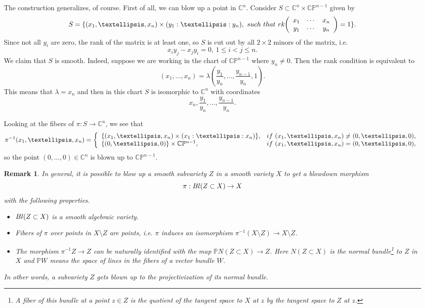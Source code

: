 \documentclass[11pt]{article}
\numberwithin{equation}{section}
\numberwithin{footnote}{section}
\newtheorem{rem}[thm]{Remark}
\renewcommand{\P}{{\mathbb P}}
\newcommand{\C}{{\mathbb C}}
\begin{document}
\smallskip
The construction generalizes, of course. First of all, we can blow up a point in $\C^n$. Consider 
$S\subset \C^n \times \C\P^{n-1}$ given by
$$
S=\{(x_1,\ldots,x_n) \times (y_1:\ldots:y_n),{\rm ~such~that~rk}\hskip -2pt
\left(
\begin{array}{ccc}
x_1& \cdots &x_n \\
y_1& \cdots &y_n 
\end{array}
\right)
=1\}.
$$
Since not all $y_i$ are zero, the rank of the matrix is at least one, so $S$ is cut out by all $2\times 2$ minors of the matrix, i.e.
$$
x_i y_j -x_j y_i =0,~ 1\leq i<j\leq n.
$$
We claim that $S$ is smooth. Indeed, suppose we are working in the chart of $\C\P^{n-1}$ where $y_n\neq 0$. Then
the rank condition is equivalent to 
$$
(x_1,\ldots,x_n) = \lambda(\frac {y_1}{y_n},\ldots,\frac {y_{n-1}}{y_n},1).
$$
This means that $\lambda =x_n$ and then in this chart $S$ is isomorphic to $\C^n$ with coordinates 
$$x_n,\frac  {y_1}{y_n},\ldots, \frac{y_{n-1}}{y_n}.$$

\smallskip
Looking at the fibers of $\pi :S \to \C^n$, we see that 
$$
\pi^{-1}(x_1,\ldots,x_n) = \left\{\begin{array}{ll}\{(x_1,\ldots,x_n)\times (x_1:\ldots:x_n)\},&{\rm if~}(x_1,\ldots,x_n)\neq (0,\ldots,0),\\
\{(0,\ldots,0)\}\times\C\P^{n-1},&{\rm if~}(x_1,\ldots,x_n)= (0,\ldots,0),\end{array}\right.
$$
so the point $(0,\ldots,0)\in\C^n$ is blown up to $\C\P^{n-1}$.

\smallskip
\begin{rem}
In general, it is possible to blow up a smooth subvariety $Z$ in a smooth variety $X$ to get a blowdown morphism
$$
\pi:{\rm Bl}(Z\subset X)\to X
$$
with the following properties.
\begin{itemize}
\item
${\rm Bl}(Z\subset X)$ is a smooth algebraic variety.

\item
Fibers of $\pi$ over points in $X\setminus Z$ are points, i.e. $\pi$ induces an isomorphism 
$\pi^{-1}(X\setminus Z)\to X\setminus Z$.

\item
The morphism $\pi^{-1}Z\to Z$ can be naturally identified with the map $\P N(Z\subset X) \to Z$.
Here $N(Z\subset X)$ is the normal bundle\footnote{ A fiber of this bundle at a point $z\in Z$ is the quotient of the tangent space to $X$ at $z$ by the tangent space to $Z$ at $z$.}
 to $Z$ in $X$ and $\P W$ means the space of lines in the fibers of 
a vector bundle $W$.
\end{itemize}
In other words, a subvariety $Z$ gets blown up to the projectivization of its normal bundle.
\end{rem}
\end{document}
